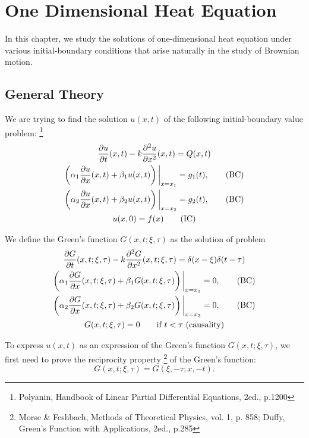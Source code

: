 \chapter{One Dimensional Heat Equation}

In this chapter, we study the solutions of one-dimensional heat equation under
various initial-boundary conditions that arise naturally in the study of
Brownian motion.

\section{General Theory}

We are trying to find the solution $u(x,t)$ of the following initial-boundary
value problem:
\footnote{Polyanin, Handbook of Linear Partial Differential Equations, 2ed.,
  p.1200}
\begin{gather} \label{E:heat_ibv}
  \frac{\partial u}{\partial t}(x,t) - k \frac{\partial^2 u}{\partial x^2}(x,t)
    = Q(x,t) \\
  \left( \alpha_1 \frac{\partial u}{\partial x}(x,t) + \beta_1 u(x,t) \right)
    \bigg\rvert_{x=x_1} = g_1(t), \qquad \text{(BC)}  \notag \\
  \left( \alpha_2 \frac{\partial u}{\partial x}(x,t) + \beta_2 u(x,t) \right)
    \bigg\rvert_{x=x_2} = g_2(t), \qquad \text{(BC)}  \notag \\
  u(x,0) = f(x) \qquad \text{(IC)} \notag
\end{gather}

We define the Green's function $G(x,t;\xi,\tau)$ as the solution of problem
\begin{gather} \label{E:heat_gre}
  \frac{\partial G}{\partial t}(x,t;\xi,\tau) 
    - k \frac{\partial^2 G}{\partial x^2}(x,t;\xi,\tau) 
    = \delta(x-\xi)\delta(t-\tau) \\
  \left( \alpha_1 \frac{\partial G}{\partial x}(x,t;\xi,\tau) 
    + \beta_1 G(x,t;\xi,\tau) \right) \bigg\rvert_{x=x_1} = 0, 
    \qquad \text{(BC)}  \notag \\
  \left( \alpha_2 \frac{\partial G}{\partial x}(x,t;\xi,\tau) 
    + \beta_2 G(x,t;\xi,\tau) \right) \bigg\rvert_{x=x_2} = 0, 
    \qquad \text{(BC)}  \notag  \\
  G(x,t;\xi,\tau)=0 \qquad \text{if $t<\tau$ (causality)} \notag
\end{gather}

To express $u(x,t)$ as an expression of the Green's function $G(x,t;\xi,\tau)$,
we first need to prove the reciprocity property
\footnote{Morse \& Feshbach, Methods of Theoretical Physics, vol. 1, p. 858;
  Duffy, Green's Function with Applications, 2ed., p.285}
of the Green's function:
\begin{equation} \label{E:green_rec}
  G(x,t;\xi,\tau)= G(\xi,-\tau;x,-t).
\end{equation}

